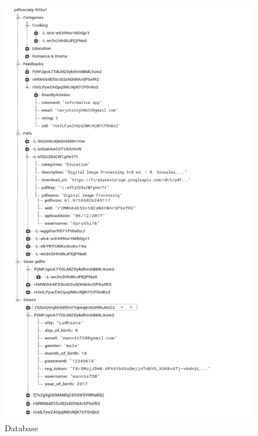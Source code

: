 \begin{figure}[ht]
\centering
\includegraphics[scale=0.3]{images/dbb.png}
\caption{Database}
\end{figure}


